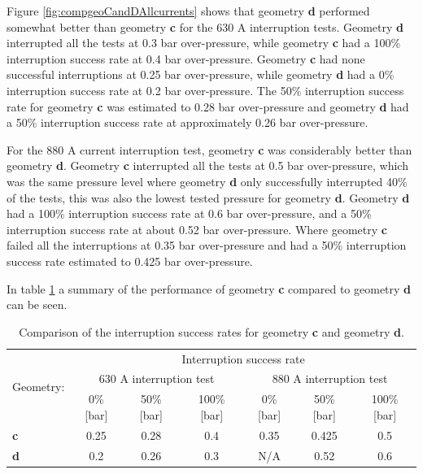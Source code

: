 \documentclass[10pt,b5paper,twoside]{article}
\begin{document}

Figure \ref{fig:compgeoCandDAllcurrents} shows that geometry \textbf{d} performed somewhat better than geometry \textbf{c} for the 630 A interruption tests. Geometry \textbf{d} interrupted all the tests at 0.3 bar over-pressure, while geometry \textbf{c} had a 100\% interruption success rate at 0.4 bar over-pressure. Geometry \textbf{c} had none successful interruptions at 0.25 bar over-pressure, while geometry \textbf{d} had a 0\% interruption success rate at 0.2 bar over-pressure. The 50\% interruption success rate for geometry \textbf{c} was estimated to 0.28 bar over-pressure and geometry \textbf{d} had a 50\% interruption success rate at approximately 0.26 bar over-pressure.

For the 880 A current interruption test, geometry \textbf{c} was considerably better than geometry \textbf{d}. Geometry \textbf{c} interrupted all the tests at 0.5 bar over-pressure, which was the same pressure level where geometry \textbf{d} only successfully interrupted 40\% of the tests, this was also the lowest tested pressure for geometry \textbf{d}. Geometry \textbf{d} had a 100\% interruption success rate at 0.6 bar over-pressure, and a 50\% interruption success rate at about 0.52 bar over-pressure. Where geometry \textbf{c} failed all the interruptions at 0.35 bar over-pressure and had a 50\% interruption success rate estimated to 0.425 bar over-pressure.

In table \ref{tab:compgeoCandD} a summary of the performance of geometry \textbf{c} compared to geometry \textbf{d} can be seen.

\begin{table}[h]
\center
\caption{Comparison of the interruption success rates for geometry \textbf{c} and geometry \textbf{d}.}
\begin{tabular}{|l|c|c|c|c|c|c|}
\hline
\multirow{3}{*}{Geometry:} & \multicolumn{6}{|c|}{Interruption success rate}                                                           \\ \cline{2-7} 
                          & \multicolumn{3}{|c}{630 A interruption test}        & \multicolumn{3}{|c|}{880 A interruption test}       \\ \cline{2-7} 
                          & 0\% {[}bar{]} & 50\% {[}bar{]} & 100\% {[}bar{]} & 0\% {[}bar{]} & 50\% {[}bar{]} & 100\% {[}bar{]} \\ \hline
\textbf{c}                & 0.25           & 0.28            & 0.4              & 0.35            & 0.425            & 0.5              \\ \hline
\textbf{d}                & 0.2            & 0.26           & 0.3              & N/A           & 0.52            & 0.6              \\ \hline
\end{tabular}
\label{tab:compgeoCandD}
\end{table}
\end{document}
